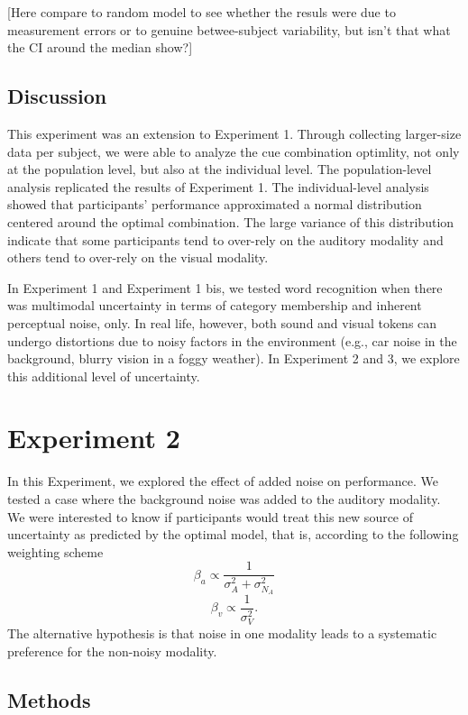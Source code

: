 \documentclass[english,,man,floatsintext]{apa6}
\theoremstyle{definition}
\theoremstyle{definition}
\theoremstyle{definition}
\theoremstyle{remark}
\begin{document}
{[}Here compare to random model to see whether the resuls were due to
measurement errors or to genuine betwee-subject variability, but isn't
that what the CI around the median show?{]}

\subsection{Discussion}\label{discussion-1}

This experiment was an extension to Experiment 1. Through collecting
larger-size data per subject, we were able to analyze the cue
combination optimlity, not only at the population level, but also at the
individual level. The population-level analysis replicated the results
of Experiment 1. The individual-level analysis showed that participants'
performance approximated a normal distribution centered around the
optimal combination. The large variance of this distribution indicate
that some participants tend to over-rely on the auditory modality and
others tend to over-rely on the visual modality.

In Experiment 1 and Experiment 1 bis, we tested word recognition when
there was multimodal uncertainty in terms of category membership and
inherent perceptual noise, only. In real life, however, both sound and
visual tokens can undergo distortions due to noisy factors in the
environment (e.g., car noise in the background, blurry vision in a foggy
weather). In Experiment 2 and 3, we explore this additional level of
uncertainty.

\section{Experiment 2}\label{experiment-2}

In this Experiment, we explored the effect of added noise on
performance. We tested a case where the background noise was added to
the auditory modality. We were interested to know if participants would
treat this new source of uncertainty as predicted by the optimal model,
that is, according to the following weighting scheme
\[\beta_a \propto \frac{1}{\sigma^2_{A}+\sigma^2_{N_A}}\]
\[\beta_v \propto \frac{1}{\sigma^2_{V}}.\] The alternative hypothesis
is that noise in one modality leads to a systematic preference for the
non-noisy modality.

\subsection{Methods}\label{methods-1}
\end{document}
